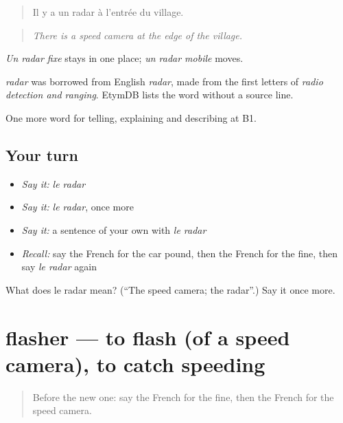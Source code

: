 \begin{quote}
Il y a un radar à l'entrée du village.
\end{quote}

\begin{quote}
\emph{There is a speed camera at the edge of the village.}
\end{quote}

\emph{Un radar fixe} stays in one place; \emph{un radar mobile} moves.

\begin{cousinweb}
\emph{radar} was borrowed from English \emph{radar}, made from the first letters of \emph{radio detection and ranging}. EtymDB lists the word without a source line.
\end{cousinweb}

\begin{grammarlens}[title={What you've built}]
One more word for telling, explaining and describing at B1.
\end{grammarlens}

\subsection*{Your turn}
\begin{itemize}
\raggedright
  \item \emph{Say it:} \emph{le radar}
  \item \emph{Say it:} \emph{le radar}, once more
  \item \emph{Say it:} a sentence of your own with \emph{le radar}
  \item \emph{Recall:} say the French for the car pound, then the French for the fine, then say \emph{le radar} again
\end{itemize}

\begin{tcolorbox}[breakable,colback=teal!4,colframe=teal!35!black,title={Before you move on}]
What does le radar mean? (\textquotedblleft{}The speed camera; the radar\textquotedblright{}.) Say it once more.
\end{tcolorbox}
\section[flasher]{flasher — to flash (of a speed camera), to catch speeding}

\label{lesson:FR-C408-flasher}



\begin{quote}
Before the new one: say the French for the fine, then the French for the speed camera.
\end{quote}

